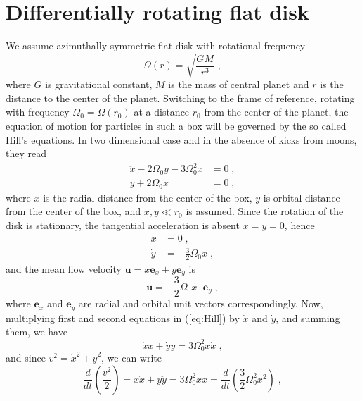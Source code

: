 \documentclass[preprint, aps, pra]{revtex4-1}
\newcommand{\bu}{{\bm{u}}}
\newcommand{\be}{{\bm{e}}}
\begin{document}
\section{Differentially rotating flat disk}
We assume azimuthally symmetric flat disk with rotational frequency 
\begin{equation}
  \Omega(r) = \sqrt{\frac{GM}{r^3}}\;,
\end{equation}
where $G$ is gravitational constant, $M$ is the mass of central planet and $r$ is the distance to the center of the planet.
Switching to the frame of reference, rotating with frequency $\Omega_0=\Omega(r_0)$ at a distance $r_0$ from the center of the planet,
the equation of motion for particles in such a box will be governed by the so called Hill's equations. In two dimensional case and in the 
absence of kicks from moons, they read
\begin{equation}
  \begin{split}
    \ddot{x}-2\Omega_0\dot{y}-3\Omega_0^2x &= 0\;,\\
    \ddot{y}+2\Omega_0\dot{x} &= 0\;,
  \end{split}
\end{equation} 
where $x$ is the radial distance from the center of the box, $y$ is orbital distance from the center of the box, and $x,y\ll r_0$ is assumed.
Since the rotation of the disk is stationary, the tangential acceleration is absent $\ddot{x}=\ddot{y}=0$, hence
\begin{equation}\label{eq:Hill}
  \begin{split}
    \dot{x} &= 0\;,\\
    \dot{y} &= -\frac{3}{2}\Omega_0 x\;,
  \end{split}
\end{equation}
and the mean flow velocity $\bu=\dot{x}\be_x+\dot{y}\be_y$ is
\begin{equation}
  \bu = -\frac{3}{2}\Omega_0 x\cdot\be_y\;,
\end{equation}
where $\be_x$ and $\be_y$ are radial and orbital unit vectors correspondingly. Now, multiplying first and second equations in (\ref{eq:Hill})
by $\dot{x}$ and $\dot{y}$, and summing them, we have
\begin{equation}
  \dot{x}\ddot{x} + \dot{y}\ddot{y} = 3\Omega_0^2x\dot{x}\;,
\end{equation}
and since $v^2=\dot{x}^2+\dot{y}^2$, we can write
\begin{equation}
  \frac{d}{dt}\left(\frac{v^2}{2}\right)=\dot{x}\ddot{x} + \dot{y}\ddot{y} = 3\Omega_0^2x\dot{x} = 
  \frac{d}{dt}\left(\frac{3}{2}\Omega_0^2x^2\right)\;,
\end{equation}
\end{document}

